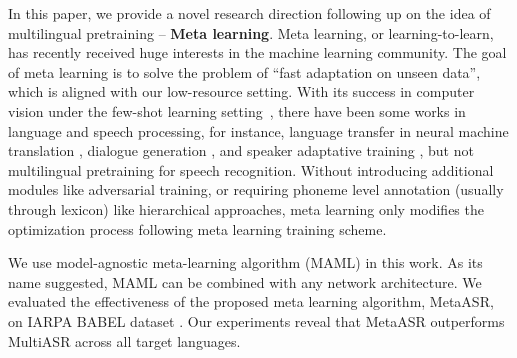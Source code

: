 In this paper, we provide a novel research direction following up on the idea of multilingual pretraining -- \textbf{Meta learning}. 
Meta learning, or learning-to-learn, has recently received huge interests in the machine learning community. The goal of meta learning is to solve the problem of ``fast adaptation on unseen data'', which is aligned with our low-resource setting.
 With its success in computer vision under the few-shot learning setting~\cite{rusu2018meta, snell2017prototypical, vinyals2016matching}, there have been some works in language and speech processing, for instance, language transfer in neural machine translation \cite{gu2018meta}, dialogue generation \cite{mi2019meta}, and speaker adaptative training \cite{klejch2018learning}, but not multilingual pretraining for speech recognition.
Without introducing additional modules like adversarial training, or requiring phoneme level annotation (usually through lexicon) like hierarchical approaches, meta learning only modifies the optimization process following meta learning training scheme.

We use model-agnostic meta-learning algorithm (MAML) \cite{finn2017model} in this work. As its name suggested, MAML can be combined with any network architecture. We evaluated the effectiveness of the proposed meta learning algorithm, MetaASR, on IARPA BABEL dataset \cite{gales2014speech}. Our experiments reveal that MetaASR outperforms MultiASR across all target languages.
